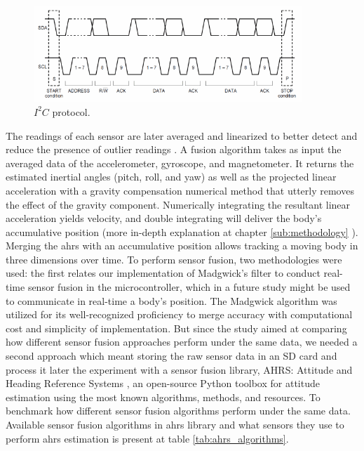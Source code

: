 \begin{figure}[!h]
    \centering
    \includegraphics[width=0.9\textwidth]{figures/i2c.png}
    \caption{ $I^2C$ protocol. }
    \label{fig:i2c}
\end{figure}

The readings of each sensor are later averaged and linearized to better detect and reduce the presence of outlier readings \cite{khamphroo2017micropython}. A fusion algorithm takes as input the averaged data of the accelerometer, gyroscope, and magnetometer. It returns the estimated inertial angles (pitch, roll, and yaw) as well as the projected linear acceleration with a gravity compensation numerical method that utterly removes the effect of the gravity component. Numerically integrating the resultant linear acceleration yields velocity, and double integrating will deliver the body's accumulative position (more in-depth explanation at chapter \ref{sub:methodology} ). Merging the \acrshort{ahrs} with an accumulative position allows tracking a moving body in three dimensions over time. To perform sensor fusion, two methodologies were used: the first relates our implementation of Madgwick's filter to conduct real-time sensor fusion in the microcontroller, which in a future study might be used to communicate in real-time a body's position. The Madgwick algorithm was utilized for its well-recognized proficiency to merge accuracy with computational cost and simplicity of implementation. But since the study aimed at comparing how different sensor fusion approaches perform under the same data, we needed a second approach which meant storing the raw sensor data in an SD card and process it later the experiment with a sensor fusion library, AHRS: Attitude and Heading Reference Systems \cite{ahrs}, an open-source Python toolbox for attitude estimation using the most known algorithms, methods, and resources. To benchmark how different sensor fusion algorithms perform under the same data. Available sensor fusion algorithms in \acrshort{ahrs} library and what sensors they use to perform \acrshort{ahrs} estimation is present at table \ref{tab:ahrs_algorithms}.


